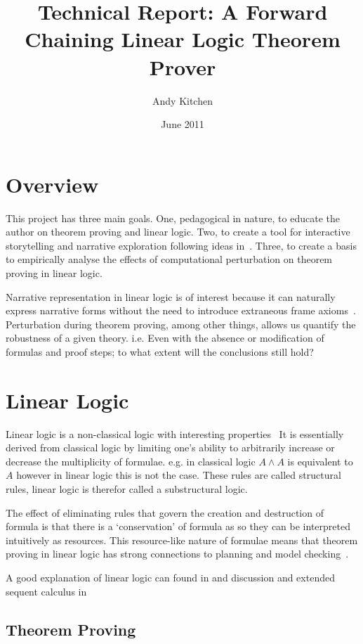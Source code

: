\documentclass[]{article}
\title{Technical Report: A Forward Chaining Linear Logic Theorem Prover}
\author{Andy Kitchen}
\date{June 2011}
\begin{document}
\maketitle

\section{Overview}

This project has three main goals. One, pedagogical in nature, to educate the
author on theorem proving and linear logic. Two, to create a tool for
interactive storytelling and narrative exploration following ideas
in~\cite{bosser2010linear}. Three, to create a basis to empirically analyse
the effects of computational perturbation on theorem proving in linear logic.

Narrative representation in linear logic is of interest because it can
naturally express narrative forms without the need to introduce extraneous
frame axioms~\cite{bosser2010linear}. Perturbation during theorem proving,
among other things, allows us quantify the robustness of a given theory. i.e.
Even with the absence or modification of formulas and proof steps; to what
extent will the conclusions still hold?

\section{Linear Logic}

Linear logic is a non-classical logic with interesting
properties~\cite{lincoln1992linear} It is essentially derived from classical
logic by limiting one's ability to arbitrarily increase or decrease the
multiplicity of formulae. e.g. in classical logic $A \wedge A$ is equivalent
to $A$ however in linear logic this is not the case. These rules are called
structural rules, linear logic is therefor called a substructural logic.

The effect of eliminating rules that govern the creation and destruction of
formula is that there is a `conservation' of formula as so they can be
interpreted intuitively as resources. This resource-like nature of formulae
means that theorem proving in linear logic has strong connections to planning
and model checking~\cite{LukeAAMAS2012}.

A good explanation of linear logic can found in \cite{girard1989proofs}
and discussion and extended sequent calculus in \cite{lincoln1992linear}

\subsection{Theorem Proving}
\end{document}
